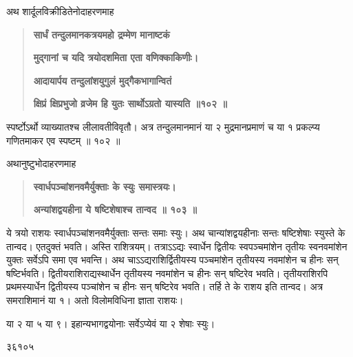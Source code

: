 \documentclass[11pt, openany]{book}
\begin{document}
\begin{sloppypar}
\hangindent=0.2in \hspace{0.2in}अथ शार्दूलविक्रीडितेनोदाहरणमाह\textendash

\begin{quote}
\hspace{1in}\textbf{सार्धं तन्दुलमानकत्रयमहो द्रम्मेण मानाष्टकं}

\hspace{1in}\textbf{मुद्गानां च यदि त्रयोदशमिता एता वणिक्काकिणीः।}

\hspace{1in}\textbf{आदायार्पय तन्दुलांशयुगुलं मुद्गैकभागान्वितं}

\hspace{1in}\textbf{क्षिप्रं क्षिप्रभुजो व्रजेम हि युतः सार्थोऽग्रतो यास्यति ॥१०२ ॥}
\end{quote}

\hangindent=0.2in \hspace{0.2in}स्पर्ष्टोऽर्थो व्याख्यातश्च लीलावतीविवृतौ। अत्र तन्दुलमानमानं या २ मुद्रमानप्रमाणं च या १ प्रकल्प्य गणितमाकर एव स्पष्टम् ॥ १०२ ॥

\hangindent=0.2in \hspace{0.2in}अथानुष्टुभोदाहरणमाह\textendash

\begin{quote}
\hspace{1in}\textbf{स्वार्धपञ्चांशनवमैर्युक्ताः के स्युः समास्त्रयः।}

\hspace{1in}\textbf{अन्यांशद्वयहीना ये षष्टिशेषाश्च तान्वद ॥ १०३ ॥}
\end{quote}

\hangindent=0.2in \hspace{0.2in}ये त्रयो राशयः स्वार्धपञ्चांशनवमैर्युक्ताः सन्तः समाः स्युः। अथ चान्यांशद्वयहीनाः सन्तः षष्टिशेषाः स्युस्ते के तान्वद। एतदुक्तं भवति। अस्ति राशित्रयम्। तत्राऽऽद्यः स्वार्धेन द्वितीयः स्वपञ्चमांशेन तृतीयः स्वनवमांशेन युक्तः सर्वेऽपि समा एव भवन्ति। अथ चाऽऽद्यराशिर्द्वितीयस्य पञ्चमांशेन तृतीयस्य नवमांशेन च हीनः सन् षष्टिर्भवति। द्वितीयराशिराद्यस्थार्धेन तृतीयस्य नवमांशेन च हीनः सन् षष्टिरेव भवति। तृतीयराशिरपि प्रथमस्यार्धेन द्वितीयस्य पञ्चांशेन च हीनः सन् षष्टिरेव भवति। तर्हि ते के राशय इति तान्वद। अत्र समराशिमानं या १। अतो विलोमविधिना ज्ञाता राशयः।

\hspace{0.5in}या २ या ५ या ९। इहान्यभागद्वयोनाः सर्वेऽप्येवं या २ शेषाः स्युः। 

\hspace{0.75in}३\hspace{0.25in}६\hspace{0.25in}१०\hspace{2.1in}५


\end{sloppypar}
\end{document}
